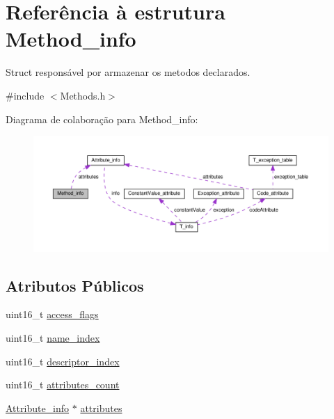 \hypertarget{structMethod__info}{}\section{Referência à estrutura Method\+\_\+info}
\label{structMethod__info}


Struct responsável por armazenar os metodos declarados.  




{\ttfamily \#include $<$Methods.\+h$>$}



Diagrama de colaboração para Method\+\_\+info\+:
\nopagebreak
\begin{figure}[H]
\begin{center}
\leavevmode
\includegraphics[width=350pt]{structMethod__info__coll__graph}
\end{center}
\end{figure}
\subsection*{Atributos Públicos}
\begin{DoxyCompactItemize}
\item 
uint16\+\_\+t \hyperlink{structMethod__info_a6d6c8c25f4bdb42b77b6a8ac6250398b}{access\+\_\+flags}
\item 
uint16\+\_\+t \hyperlink{structMethod__info_ad1f067bfd8d2d231f598824676dc7851}{name\+\_\+index}
\item 
uint16\+\_\+t \hyperlink{structMethod__info_af713175c97f681296e801e0c11e0ae34}{descriptor\+\_\+index}
\item 
uint16\+\_\+t \hyperlink{structMethod__info_afd638bcc6f20cfa8dd1de8741c8b5493}{attributes\+\_\+count}
\item 
\hyperlink{structAttribute__info}{Attribute\+\_\+info} $\ast$ \hyperlink{structMethod__info_a56fbb565dcff2992d66f57b29774c322}{attributes}
\end{DoxyCompactItemize}


